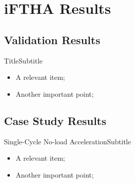 \section{iFTHA Results}

\subsection{Validation Results}

    \begin{frame}{Title}{Subtitle}\vspace*{-2em}
        \begin{itemize}
            \item<2->  A \alert{relevant} item;
            \item<3->  Another \alert{important} point;
        \end{itemize}
    \end{frame}

\subsection{Case Study Results}

    \begin{frame}{Single-Cycle No-load Acceleration}{Subtitle}\vspace*{-2em}
        \begin{itemize}
            \item<2->  A \alert{relevant} item;
            \item<3->  Another \alert{important} point;
        \end{itemize}
    \end{frame}

